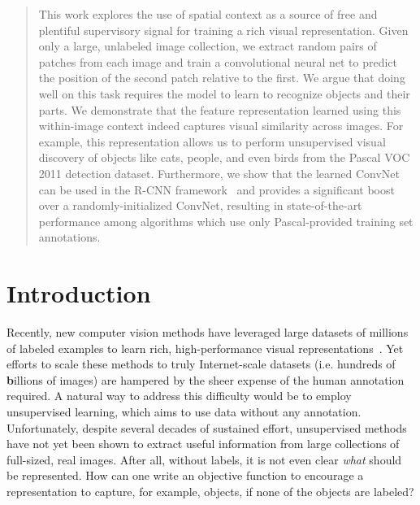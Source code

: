 \documentclass[10pt,twocolumn,letterpaper]{article}
\begin{document}
\begin{abstract}
This work explores the use of spatial context as a source of free and plentiful supervisory signal for training a rich visual representation.  Given only a large, unlabeled image collection, we extract random pairs of patches from each image and train a convolutional neural net to predict the position of the second patch relative to the first. We argue that doing well on this task requires the model to learn to recognize objects and their parts. We demonstrate that the feature representation learned
using this within-image context indeed captures visual similarity across images. For example, this representation allows us to perform unsupervised visual discovery of objects like cats, people, and even birds from the Pascal VOC 2011 detection dataset. Furthermore, we show that the learned ConvNet can be used in the R-CNN framework~\cite{girshick2014rich} and provides a significant boost over a randomly-initialized ConvNet, resulting in state-of-the-art performance among algorithms which use only Pascal-provided training set annotations.

\end{abstract}

\vspace{-0.2in}
\section{Introduction}
\vspace{-0.05in}
Recently, 
new computer vision methods have leveraged large datasets of millions of labeled examples to learn rich, high-performance visual representations~\cite{krizhevsky2012imagenet}. 
Yet efforts to scale these methods to truly Internet-scale datasets (i.e. hundreds of {\bf b}illions of images) are hampered by the sheer expense of the human annotation required. 
A natural way to address this difficulty would be to employ unsupervised learning, which aims to use data without any annotation.  Unfortunately, despite several decades of sustained effort, unsupervised methods
have not yet been shown to extract useful information from
large collections of full-sized, real images.  
After all, without labels, it is not even clear \textit{what} should be represented. How can one write an objective function to encourage a representation to capture, for example, objects, if none of the objects are labeled?   
\end{document}
